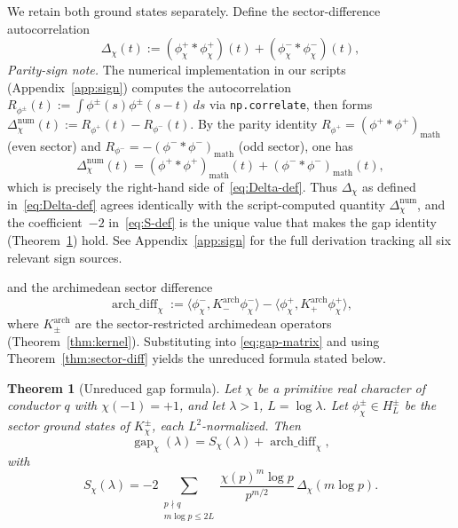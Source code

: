 \documentclass[a4paper,10pt,twocolumn]{article}
\newtheorem{theorem}{Theorem}[section]
\theoremstyle{definition}
\theoremstyle{remark}
\newcommand{\gap}{\operatorname{gap}}
\newcommand{\chifn}{\chi}
\newcommand{\Deltachi}{\Delta_{\chifn}}
\newcommand{\archdiff}{\operatorname{arch\_diff}}
\begin{document}
We retain both ground states separately. Define the sector-difference
autocorrelation
\begin{equation}
\label{eq:Delta-def}
  \Deltachi(t)
    := (\phi^+_{\chifn}\!*\phi^+_{\chifn})(t)
      + (\phi^-_{\chifn}\!*\phi^-_{\chifn})(t),
\end{equation}
\emph{Parity-sign note.} The numerical implementation in our scripts
(Appendix~\ref{app:sign}) computes the autocorrelation
$R_{\phi^\pm}(t):=\int\phi^\pm(s)\phi^\pm(s-t)\,ds$ via
\texttt{np.correlate}, then forms
$\Deltachi^{\mathrm{num}}(t):=R_{\phi^+}(t)-R_{\phi^-}(t)$. By the
parity identity $R_{\phi^+}=(\phi^+{*}\phi^+)_{\mathrm{math}}$
(even sector) and $R_{\phi^-}=-(\phi^-{*}\phi^-)_{\mathrm{math}}$
(odd sector), one has
\[
  \Deltachi^{\mathrm{num}}(t)
    =(\phi^+{*}\phi^+)_{\mathrm{math}}(t)+(\phi^-{*}\phi^-)_{\mathrm{math}}(t),
\]
which is precisely the right-hand side of~\eqref{eq:Delta-def}. Thus
$\Deltachi$ as defined in~\eqref{eq:Delta-def} agrees identically with
the script-computed quantity $\Deltachi^{\mathrm{num}}$, and the
coefficient~$-2$ in~\eqref{eq:S-def} is the unique value that makes
the gap identity (Theorem~\ref{thm:closure}) hold. See
Appendix~\ref{app:sign} for the full derivation tracking all six
relevant sign sources.

and the archimedean sector difference
\begin{equation}
\label{eq:arch-diff-def}
  \archdiff_{\chifn}
    := \langle\phi^-_{\chifn},K^{\mathrm{arch}}_-\phi^-_{\chifn}\rangle
     - \langle\phi^+_{\chifn},K^{\mathrm{arch}}_+\phi^+_{\chifn}\rangle,
\end{equation}
where $K^{\mathrm{arch}}_\pm$ are the sector-restricted archimedean
operators (Theorem~\ref{thm:kernel}). Substituting into
\eqref{eq:gap-matrix} and using Theorem~\ref{thm:sector-diff} yields
the unreduced formula stated below.

\begin{theorem}[Unreduced gap formula]
\label{thm:closure}
Let $\chifn$ be a primitive real character of conductor $q$ with
$\chifn(-1)=+1$, and let $\lambda>1$, $L=\log\lambda$. Let
$\phi^\pm_{\chifn}\in H_L^\pm$ be the sector ground states of
$K_{\chifn}^\pm$, each $L^2$-normalized. Then
\begin{equation}
\label{eq:gap-unreduced}
  \gap_{\chifn}(\lambda)
    = S_{\chifn}(\lambda) + \archdiff_{\chifn},
\end{equation}
with
\begin{equation}
\label{eq:S-def}
  S_{\chifn}(\lambda)
    = -2\sum_{\substack{p\nmid q\\m\log p\leq 2L}}
      \frac{\chifn(p)^m\log p}{p^{m/2}}\,\Deltachi(m\log p).
\end{equation}
\end{theorem}
\end{document}
